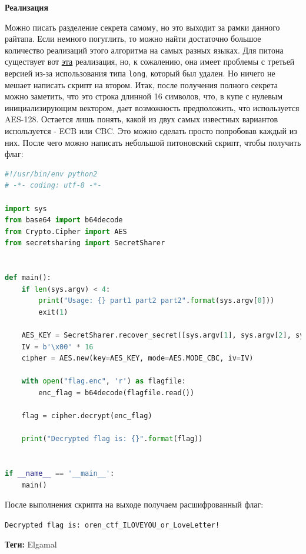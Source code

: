 \documentclass[idxtotoc,hyperref,openany,oneside]{files/crypto} %
\begin{document}
\textbf{Реализация}

Можно писать разделение секрета самому, но это выходит за рамки данного райтапа. Если немного погуглить, то можно найти достаточно большое количество реализаций этого алгоритма на самых разных языках. Для питона существует вот \href{https://github.com/shea256/secret-sharing}{эта} реализация, но, к сожалению, она имеет проблемы с третьей версией из-за использования типа \verb|long|, который был удален. Но ничего не мешает написать скрипт на втором. Итак, после получения полного секрета можно заметить, что это строка длинной 16 символов, что, в купе с нулевым инициализирующим вектором, дает возможность предположить, что используется AES-128. Остается лишь понять, какой из двух самых известных вариантов используется - ECB или CBC. Это можно сделать просто попробовав каждый из них. После чего можно написать небольшой питоновский скрипт, чтобы получить флаг:
\begin{lstlisting}[language=Python, caption=Расшифровка флага AES-CBC]
#!/usr/bin/env python2
# -*- coding: utf-8 -*-

import sys
from base64 import b64decode
from Crypto.Cipher import AES
from secretsharing import SecretSharer


def main():
    if len(sys.argv) < 4:
        print("Usage: {} part1 part2 part2".format(sys.argv[0]))
        exit(1)

    AES_KEY = SecretSharer.recover_secret([sys.argv[1], sys.argv[2], sys.argv[3]])
    IV = b'\x00' * 16
    cipher = AES.new(key=AES_KEY, mode=AES.MODE_CBC, iv=IV)

    with open("flag.enc", 'r') as flagfile:
        enc_flag = b64decode(flagfile.read())

    flag = cipher.decrypt(enc_flag)

    print("Decrypted flag is: {}".format(flag))


if __name__ == '__main__':
    main()
\end{lstlisting}

После выполнения скрипта на выходе получаем расшифрованный флаг: 

\verb|Decrypted flag is: oren_ctf_ILOVEYOU_or_LoveLetter!|




\textbf{Теги:} Elgamal\vspace{\baselineskip}
\end{document}

